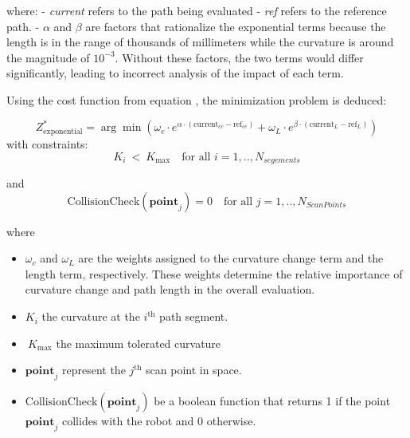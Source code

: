     \noindent
where: 
    \newline
    - \textit{current} refers to the path being evaluated
    \newline
    - \textit{ref} refers to the reference path.
    \newline
    - \(\alpha\) and \(\beta\) are factors that rationalize the exponential terms because the length is in the range 
    of thousands of millimeters while the curvature is around the magnitude of \(10^{-3}\).
    Without these factors, the two terms would differ significantly, leading to incorrect analysis of the impact of each term.
    
Using the cost function from equation , the minimization problem is deduced:

\begin{equation}
Z_{\text{exponential}}^{\ast }=\arg \min \left(\omega_{c} \cdot e^{\alpha \cdot \left( \text{current}_{cc} - \text{ref}_{cc} \right)} + \omega_{L} 
\cdot e^{\beta \cdot \left( \text{current}_L - \text{ref}_L \right)} \right)
\label{exp_function}
\end{equation}
\noindent
with constraints: \[K_i\ <\ K_{\max} \quad \text{for all }  i=1,.., N_{segements}\]
\noindent

and \[\text{CollisionCheck}(\mathbf{point}_j) = 0 \quad \text{for all } j=1,..,N_{ScanPoints}\]


where \begin{itemize}
    \item \(\omega_c\) and \(\omega_L\) are the weights assigned to the curvature change term and the length term, 
    respectively. These weights determine the relative importance of curvature change and path length in the overall 
    evaluation. 
    \item \(K_i\) the curvature at the \(i^{\mathrm{th}}\) path segment.

    \item \(\ K_{\max}\) the maximum tolerated curvature
    \item \( \mathbf{point}_j \) represent the \( j^{\mathrm{th}} \) scan point in space. 

    \item \( \text{CollisionCheck}(\mathbf{point}_j) \) be a boolean function that returns 1 if the point \( \mathbf{point}_j \) 
    collides with the robot and 0 otherwise.
    
\end{itemize}



